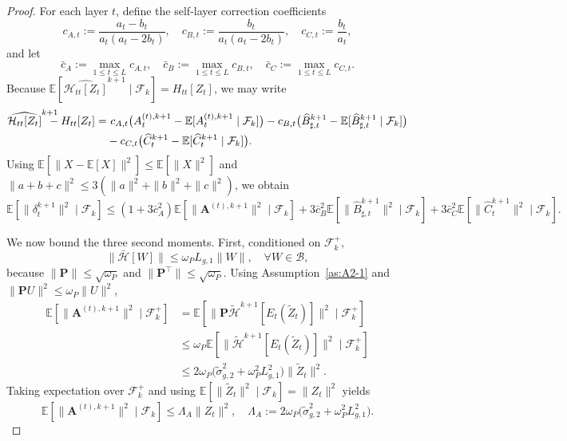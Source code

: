 \documentclass{pkumelon}
\theoremstyle{plain}
\newcommand{\E}{\mathbb{E}}
\begin{document}
\begin{proof}
For each layer $t$, define the self-layer correction coefficients
\begin{equation*}
c_{A,t}:=\frac{a_t-b_t}{a_t(a_t-2b_t)}, \quad c_{B,t}:=\frac{b_t}{a_t(a_t-2b_t)}, \quad c_{C,t}:=\frac{b_t}{a_t},
\end{equation*}
and let
\begin{equation*}
\bar c_A:=\max_{1\le t\le L} c_{A,t}, \quad \bar c_B:=\max_{1\le t\le L} c_{B,t}, \quad \bar c_C:=\max_{1\le t\le L} c_{C,t}.
\end{equation*}
Because $\E[\widehat{\mathcal H_{tt}[Z_t]}^{k+1}\mid \mathcal F_k]=H_{tt}[Z_t]$, we may write
\begin{equation*}
\begin{aligned}
\widehat{\mathcal H_{tt}[Z_t]}^{k+1}\hspace{-1.0em}-H_{tt}[Z_t]
=&\ c_{A,t}\bigl(A_t^{(t),k+1}-\E[A_t^{(t),k+1}\mid \mathcal F_k]\bigr)-c_{B,t}\bigl(\widehat B_{\sharp,t}^{k+1}-\E[\widehat B_{\sharp,t}^{k+1}\mid \mathcal F_k]\bigr)\\
&-c_{C,t}\bigl(\widehat C_t^{k+1}-\E[\widehat C_t^{k+1}\mid \mathcal F_k]\bigr).
\end{aligned}
\end{equation*}
Using $\E[\|X-\E[X]\|^2]\le \E[\|X\|^2]$ and $\|a+b+c\|^2\le 3(\|a\|^2+\|b\|^2+\|c\|^2)$, we obtain
\begin{equation*}
\E[\|\delta_t^{k+1}\|^2\mid \mathcal F_k] \le (1+3\bar c_A^2)\E[\|\boldsymbol A^{(t),k+1}\|^2\mid \mathcal F_k] +3\bar c_B^2\E[\|\widehat B_{\sharp,t}^{k+1}\|^2\mid \mathcal F_k] +3\bar c_C^2\E[\|\widehat C_t^{k+1}\|^2\mid \mathcal F_k].
\end{equation*}

We now bound the three second moments. First, conditioned on $\mathcal F_k^+$,
\begin{equation*}
\|\bar{\mathcal H}[W]\| \le \omega_P L_{g,1}\|W\|, \quad \forall W\in\mathcal B,
\end{equation*}
because $\|\boldsymbol P\|\le \sqrt{\omega_P}$ and $\|\boldsymbol P^\top\|\le \sqrt{\omega_P}$. Using Assumption~\ref{as:A2-1} and $\|\boldsymbol P U\|^2\le \omega_P\|U\|^2$,
\begin{equation*}
\begin{aligned}
\E[\|\boldsymbol A^{(t),k+1}\|^2\mid \mathcal F_k^+]
&=
\E[\|\boldsymbol P\tilde{\mathcal H}^{k+1}[E_t(\tilde Z_t)]\|^2\mid \mathcal F_k^+] \\
&\le
\omega_P\E[\|\tilde{\mathcal H}^{k+1}[E_t(\tilde Z_t)]\|^2\mid \mathcal F_k^+] \\
&\le
2\omega_P\bigl(\tilde\sigma_{g,2}^2+\omega_P^2L_{g,1}^2\bigr)\|\tilde Z_t\|^2.
\end{aligned}
\end{equation*}
Taking expectation over $\mathcal F_k^+$ and using $\E[\|\tilde Z_t\|^2\mid \mathcal F_k]=\|Z_t\|^2$ yields
\begin{equation*}
\E[\|\boldsymbol A^{(t),k+1}\|^2\mid \mathcal F_k] \le \Lambda_A\|Z_t\|^2, \quad \Lambda_A:=2\omega_P\bigl(\tilde\sigma_{g,2}^2+\omega_P^2L_{g,1}^2\bigr).
\end{equation*}


\end{proof}
\end{document}
